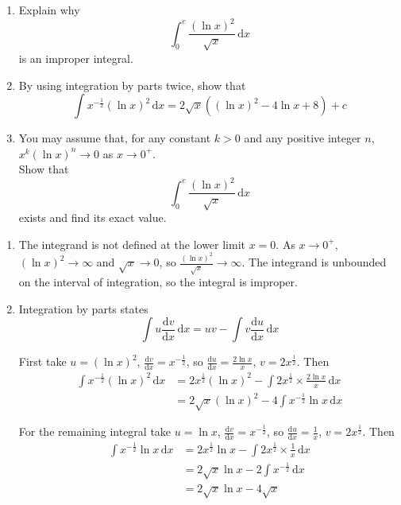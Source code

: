 \documentclass[leqno]{article}
\begin{document}
\begin{enumerate}[
  label=\textbf{\arabic*.},
  leftmargin=*,
  topsep=0pt,
  partopsep=0pt,
  parsep=0pt
]
\newpage

\questionitem

\begin{enumerate}[label=\textbf{(\alph*)}]
  \item Explain why
  \[\int_0^{e} \dfrac{(\ln x)^2}{\sqrt{x}}\,\mathrm{d}x\]
  is an improper integral.  \\
  \item By using integration by parts twice, show that
  \[\int x^{-\frac{1}{2}} (\ln x)^2\,\mathrm{d}x = 2\sqrt{x}\left((\ln x)^2 - 4\ln x + 8\right) + c\] 
  \item You may assume that, for any constant $k > 0$ and any positive integer $n$, $x^k(\ln x)^n \to 0$ as $x \to 0^{+}$. \\

  Show that
  \[\int_0^{e} \dfrac{(\ln x)^2}{\sqrt{x}}\,\mathrm{d}x\]
  exists and find its exact value.  \\
\end{enumerate}

\vspace*{10pt}

\begin{djsSolution}
\begin{enumerate}[label=\textbf{(\alph*)}, start=1]
  \item The integrand is not defined at the lower limit \(x=0\). As \(x\to0^{+}\), \((\ln x)^2\to\infty\) and \(\sqrt{x}\to0\), so \(\frac{(\ln x)^2}{\sqrt{x}}\to\infty\). The integrand is unbounded on the interval of integration, so the integral is improper.

  \item Integration by parts states
\[
\int u\frac{\mathrm{d}v}{\mathrm{d}x}\,\mathrm{d}x = uv-\int v\frac{\mathrm{d}u}{\mathrm{d}x}\,\mathrm{d}x
\]

First take \(u=(\ln x)^2\), \(\frac{\mathrm{d}v}{\mathrm{d}x}=x^{-\frac12}\), so \(\frac{\mathrm{d}u}{\mathrm{d}x}=\frac{2\ln x}{x}\), \(v=2x^{\frac12}\). Then
\begin{align*}
\int x^{-\frac12}(\ln x)^2\,\mathrm{d}x &= 2x^{\frac12}(\ln x)^2-\int 2x^{\frac12}\times\frac{2\ln x}{x}\,\mathrm{d}x\\
&= 2\sqrt{x}(\ln x)^2-4\int x^{-\frac12}\ln x\,\mathrm{d}x
\end{align*}

For the remaining integral take \(u=\ln x\), \(\frac{\mathrm{d}v}{\mathrm{d}x}=x^{-\frac12}\), so \(\frac{\mathrm{d}u}{\mathrm{d}x}=\frac{1}{x}\), \(v=2x^{\frac12}\). Then
\begin{align*}
\int x^{-\frac12}\ln x\,\mathrm{d}x &= 2x^{\frac12}\ln x-\int 2x^{\frac12}\times\frac{1}{x}\,\mathrm{d}x\\
&= 2\sqrt{x}\ln x-2\int x^{-\frac12}\,\mathrm{d}x\\
&= 2\sqrt{x}\ln x-4\sqrt{x}
\end{align*}


\end{enumerate}
\end{djsSolution}
\end{enumerate}
\end{document}
